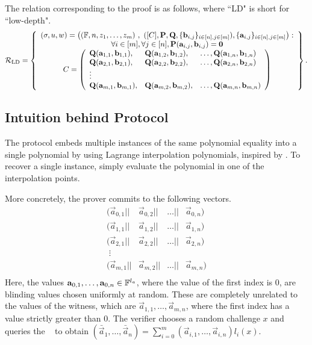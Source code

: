 The relation corresponding to the proof is as follows, where ``LD" is short for ``low-depth". $$\mathcal{R}_\mathrm{LD}= \left\{\begin{array}{c}
(\mathsf{\sigma},u,w)=\left( (\mathbb{F},n,z_1,\ldots,z_m)\ , \  ([C],\mathbf{P},\mathbf{Q},\lbrace \mathbf{b}_{i,j} \rbrace_{i \in [n], j \in [m]}), \lbrace \mathbf{a}_{i,j} \rbrace_{i \in [n], j \in [m]} \right):\\
\forall i \in [m], \forall j \in [n], \mathbf{P}(\mathbf{a}_{i,j},\mathbf{b}_{i,j})=\mathbf{0} \\
C = \left(\begin{array}{lll}
\mathbf{Q}(\mathbf{a}_{1,1},\mathbf{b}_{1,1}),&\mathbf{Q}(\mathbf{a}_{1,2},\mathbf{b}_{1,2}),& \ldots,\mathbf{Q}(\mathbf{a}_{1,n},\mathbf{b}_{1,n}) \\
\mathbf{Q}(\mathbf{a}_{2,1},\mathbf{b}_{2,1}),&\mathbf{Q}(\mathbf{a}_{2,2},\mathbf{b}_{2,2}),& \ldots,\mathbf{Q}(\mathbf{a}_{2,n},\mathbf{b}_{2,n}) \\
\vdots \\
\mathbf{Q}(\mathbf{a}_{m,1},\mathbf{b}_{m,1}),&\mathbf{Q}(\mathbf{a}_{m,2},\mathbf{b}_{m,2}),& \ldots,\mathbf{Q}(\mathbf{a}_{m,n},\mathbf{b}_{m,n}) \\
\end{array}\right)
\end{array}\right\}.$$

\subsection{Intuition behind Protocol}
The protocol embeds multiple instances of the same polynomial equality into a single polynomial by using Lagrange interpolation polynomials, inspired by \cite{Gennaro2013,Bayer2014}. To recover a single instance, simply evaluate the polynomial in one of the interpolation points.

More concretely, the prover commits to the following vectors.
$$\begin{array}{llllll}
(\vec{a}_{0,1}||&\vec{a}_{0,2}||&\ldots||&\vec{a}_{0,n}) \\
(\vec{a}_{1,1}||&\vec{a}_{1,2}||&\ldots||&\vec{a}_{1,n}) \\
(\vec{a}_{2,1}||&\vec{a}_{2,2}||&\ldots||&\vec{a}_{2,n}) \\
\;\vdots \\
(\vec{a}_{m,1}||&\vec{a}_{m,2}||&\ldots||&\vec{a}_{m,n}) \\
\end{array}$$
Here, the values $\mathbf{a}_{0,1},\ldots,\mathbf{a}_{0,n} \in \mathbb{F}^{l_a}$, where the value of the first index is $0$, are blinding values chosen uniformly at random. These are completely unrelated to the values of the witness, which are $\vec{a}_{1,1},\ldots,\vec{a}_{m,n}$, where the first index has a value strictly greater than $0$. The verifier chooses a random challenge $x$ and queries the \ILC~ to obtain $(\bar{\vec{a}}_1,\ldots,\bar{\vec{a}}_n) = \sum_{i=0}^m (\vec{a}_{i,1},\ldots,\vec{a}_{i,n}) l_i(x)$.

